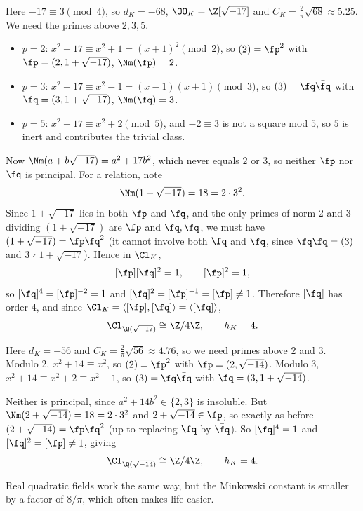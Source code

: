 \begin{example}[$K = \Q(\sqrt{-17})$]\label{ex:cl17}
	Here $-17\equiv3\pmod4$, so $d_K = -68$, $\OO_K = \Z[\sqrt{-17}]$ and $C_K = \tfrac2\pi\sqrt{68}\approx5.25$. We need the primes above $2, 3, 5$.
	\begin{itemize}
		\item $p=2$: $x^2+17\equiv x^2+1 = (x+1)^2 \pmod 2$, so $(2) = \fp^2$ with $\fp = (2,1+\sqrt{-17})$, $\Nm(\fp) = 2$.
		\item $p=3$: $x^2+17\equiv x^2-1 = (x-1)(x+1)\pmod3$, so $(3) = \fq\bar\fq$ with $\fq = (3,1+\sqrt{-17})$, $\Nm(\fq)=3$.
		\item $p=5$: $x^2+17\equiv x^2+2 \pmod 5$, and $-2\equiv3$ is not a square mod $5$, so $5$ is inert and contributes the trivial class.
	\end{itemize}
	Now $\Nm(a+b\sqrt{-17}) = a^2+17b^2$, which never equals $2$ or $3$, so neither $\fp$ nor $\fq$ is principal. For a relation, note
	$$\Nm(1+\sqrt{-17}) = 18 = 2\cdot3^2.$$
	Since $1+\sqrt{-17}$ lies in both $\fp$ and $\fq$, and the only primes of norm $2$ and $3$ dividing $(1+\sqrt{-17})$ are $\fp$ and $\fq,\bar\fq$, we must have $(1+\sqrt{-17}) = \fp\fq^2$ (it cannot involve both $\fq$ and $\bar\fq$, since $\fq\bar\fq = (3)$ and $3 \nmid 1+\sqrt{-17}$). Hence in $\Cl_K$,
	$$[\fp][\fq]^2 = 1, \qquad [\fp]^2 = 1,$$
	so $[\fq]^4 = [\fp]^{-2} = 1$ and $[\fq]^2 = [\fp]^{-1} = [\fp] \ne 1$. Therefore $[\fq]$ has order $4$, and since $\Cl_K = \langle[\fp],[\fq]\rangle = \langle[\fq]\rangle$,
	$$\Cl_{\Q(\sqrt{-17})} \cong \Z/4\Z, \qquad h_K = 4.$$
\end{example}

\begin{example}[$K = \Q(\sqrt{-14})$]
	Here $d_K = -56$ and $C_K = \tfrac2\pi\sqrt{56}\approx 4.76$, so we need primes above $2$ and $3$. Modulo $2$, $x^2+14\equiv x^2$, so $(2) = \fp^2$ with $\fp = (2,\sqrt{-14})$. Modulo $3$, $x^2+14\equiv x^2+2\equiv x^2-1$, so $(3) = \fq\bar\fq$ with $\fq = (3,1+\sqrt{-14})$.

	Neither is principal, since $a^2+14b^2 \in \{2,3\}$ is insoluble. But $\Nm(2+\sqrt{-14}) = 18 = 2\cdot3^2$ and $2+\sqrt{-14} \in\fp$, so exactly as before $(2+\sqrt{-14}) = \fp\fq^2$ (up to replacing $\fq$ by $\bar\fq$). So $[\fq]^4=1$ and $[\fq]^2 = [\fp]\ne1$, giving
	$$\Cl_{\Q(\sqrt{-14})}\cong\Z/4\Z, \qquad h_K = 4.$$
\end{example}

Real quadratic fields work the same way, but the Minkowski constant is smaller by a factor of $8/\pi$, which often makes life easier.

